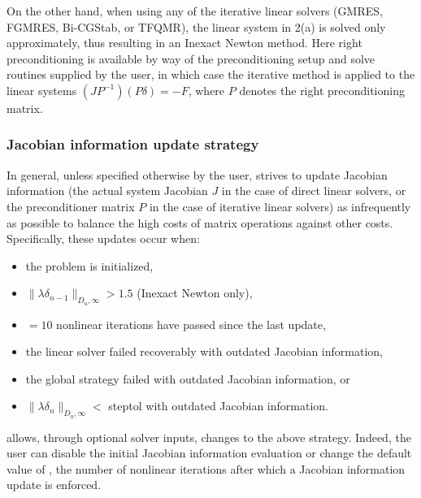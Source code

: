 On the other hand, when using any of the iterative linear solvers
(GMRES, FGMRES, Bi-CGStab, or TFQMR), the linear system in 2(a) is solved only
approximately, thus resulting in an Inexact Newton method.  Here right
preconditioning is available by way of the preconditioning setup and
solve routines supplied by the user, in which case the iterative
method is applied to the linear systems $(JP^{-1})(P\delta) = -F$,
where $P$ denotes the right preconditioning matrix.


\subsubsection*{Jacobian information update strategy}
In general, unless specified otherwise by the user, {\kinsol} strives to update
Jacobian information (the actual system Jacobian $J$ in the case of direct linear
solvers, or the preconditioner matrix $P$ in the case of iterative linear solvers)
as infrequently as possible to balance the high costs of matrix operations against 
other costs. Specifically, these updates occur when:
\begin{itemize}
\item the problem is initialized,
\item $\|\lambda\delta_{n-1}\|_{D_u,\infty} > 1.5$ (Inexact Newton only),
\item {}$=10$ nonlinear iterations have passed since the last update,
\item the linear solver failed recoverably with outdated Jacobian information,
\item the global strategy failed with outdated Jacobian information, or
\item $\|\lambda\delta_{n}\|_{D_u,\infty} < $ {\sc steptol} with outdated Jacobian
  information.
\end{itemize}
{\kinsol} allows, through optional solver inputs, changes to the above strategy.
Indeed, the user can disable the initial Jacobian information evaluation or change
the default value of , the number of nonlinear iterations after which a
Jacobian information update is enforced.


